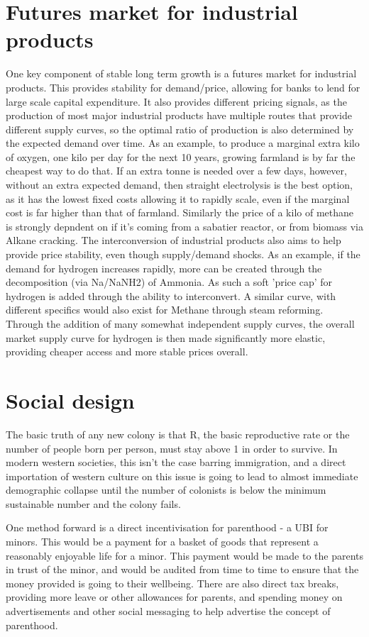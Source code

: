 \documentclass[10pt]{article}
\begin{document}
\section{Futures market for industrial products}
One key component of stable long term growth is a futures market for industrial products. This provides stability for demand/price, allowing for banks to lend for large scale capital expenditure. It also provides different pricing signals, as the production of most major industrial products have multiple routes that provide different supply curves, so the optimal ratio of production is also determined by the expected demand over time. As an example, to produce a marginal extra kilo of oxygen, one kilo per day for the next 10 years, growing farmland is by far the cheapest way to do that. If an extra tonne is needed over a few days, however, without an extra expected demand, then straight electrolysis is the best option, as it has the lowest fixed costs allowing it to rapidly scale, even if the marginal cost is far higher than that of farmland. Similarly the price of a kilo of methane is strongly depndent on if it's coming from a sabatier reactor, or from biomass via Alkane cracking. The interconversion of industrial products also aims to help provide price stability, even though supply/demand shocks. As an example, if the demand for hydrogen increases rapidly, more can be created through the decomposition (via Na/NaNH2) of Ammonia. As such a soft 'price cap' for hydrogen is added through the ability to interconvert. A similar curve, with different specifics would also exist for Methane through steam reforming. Through the addition of many somewhat independent supply curves, the overall market supply curve for hydrogen is then made significantly more elastic, providing cheaper access and more stable prices overall.

\section{Social design}
The basic truth of any new colony is that R, the basic reproductive rate or the number of people born per person, must stay above 1 in order to survive. In modern western societies, this isn't the case barring immigration, and a direct importation of western culture on this issue is going to lead to almost immediate demographic collapse until the number of colonists is below the minimum sustainable number and the colony fails.

One method forward is a direct incentivisation for parenthood - a UBI for minors. This would be a payment for a basket of goods that represent a reasonably enjoyable life for a minor. This payment would be made to the parents in trust of the minor, and would be audited from time to time to ensure that the money provided is going to their wellbeing. There are also direct tax breaks, providing more leave or other allowances for parents, and spending money on advertisements and other social messaging to help advertise the concept of parenthood.
\end{document}
